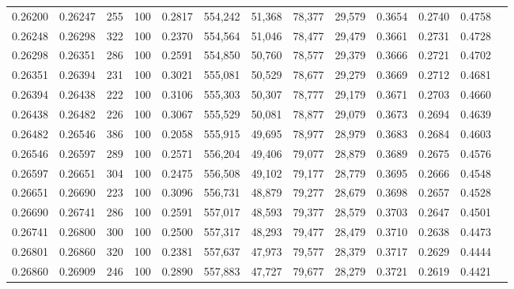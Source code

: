 \begin{tabular}{rrrrrrrrrrrrr}
0.26200 & 0.26247 &   255 & 100 &                                     0.2817 & 554,242 &  51,368 &  78,377 &  29,579 & 0.3654 & 0.2740 & 0.4758 \\
0.26248 & 0.26298 &   322 & 100 &                                     0.2370 & 554,564 &  51,046 &  78,477 &  29,479 & 0.3661 & 0.2731 & 0.4728 \\
0.26298 & 0.26351 &   286 & 100 &                                     0.2591 & 554,850 &  50,760 &  78,577 &  29,379 & 0.3666 & 0.2721 & 0.4702 \\
0.26351 & 0.26394 &   231 & 100 &                                     0.3021 & 555,081 &  50,529 &  78,677 &  29,279 & 0.3669 & 0.2712 & 0.4681 \\
0.26394 & 0.26438 &   222 & 100 &                                     0.3106 & 555,303 &  50,307 &  78,777 &  29,179 & 0.3671 & 0.2703 & 0.4660 \\
0.26438 & 0.26482 &   226 & 100 &                                     0.3067 & 555,529 &  50,081 &  78,877 &  29,079 & 0.3673 & 0.2694 & 0.4639 \\
0.26482 & 0.26546 &   386 & 100 &                                     0.2058 & 555,915 &  49,695 &  78,977 &  28,979 & 0.3683 & 0.2684 & 0.4603 \\
0.26546 & 0.26597 &   289 & 100 &                                     0.2571 & 556,204 &  49,406 &  79,077 &  28,879 & 0.3689 & 0.2675 & 0.4576 \\
0.26597 & 0.26651 &   304 & 100 &                                     0.2475 & 556,508 &  49,102 &  79,177 &  28,779 & 0.3695 & 0.2666 & 0.4548 \\
0.26651 & 0.26690 &   223 & 100 &                                     0.3096 & 556,731 &  48,879 &  79,277 &  28,679 & 0.3698 & 0.2657 & 0.4528 \\
0.26690 & 0.26741 &   286 & 100 &                                     0.2591 & 557,017 &  48,593 &  79,377 &  28,579 & 0.3703 & 0.2647 & 0.4501 \\
0.26741 & 0.26800 &   300 & 100 &                                     0.2500 & 557,317 &  48,293 &  79,477 &  28,479 & 0.3710 & 0.2638 & 0.4473 \\
0.26801 & 0.26860 &   320 & 100 &                                     0.2381 & 557,637 &  47,973 &  79,577 &  28,379 & 0.3717 & 0.2629 & 0.4444 \\
0.26860 & 0.26909 &   246 & 100 &                                     0.2890 & 557,883 &  47,727 &  79,677 &  28,279 & 0.3721 & 0.2619 & 0.4421 \\

\end{tabular}
